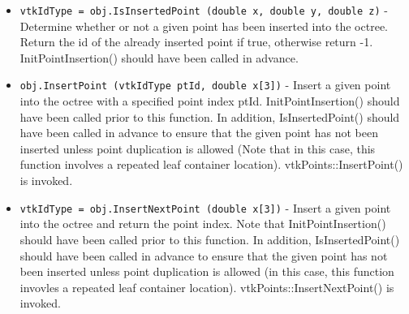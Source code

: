 \begin{itemize}
\item  \verb|vtkIdType = obj.IsInsertedPoint (double x, double y, double z)| -  Determine whether or not a given point has been inserted into the octree.
 Return the id of the already inserted point if true, otherwise return -1.
 InitPointInsertion() should have been called in advance.

\item  \verb|obj.InsertPoint (vtkIdType ptId, double x[3])| -  Insert a given point into the octree with a specified point index ptId.
 InitPointInsertion() should have been called prior to this function. In 
 addition, IsInsertedPoint() should have been called in advance to ensure
 that the given point has not been inserted unless point duplication is 
 allowed (Note that in this case, this function involves a repeated leaf 
 container location). vtkPoints::InsertPoint() is invoked.

\item  \verb|vtkIdType = obj.InsertNextPoint (double x[3])| -  Insert a given point into the octree and return the point index. Note that
 InitPointInsertion() should have been called prior to this function. In 
 addition, IsInsertedPoint() should have been called in advance to ensure 
 that the given point has not been inserted unless point duplication is 
 allowed (in this case, this function invovles a repeated leaf container 
 location). vtkPoints::InsertNextPoint() is invoked.

\end{itemize}
